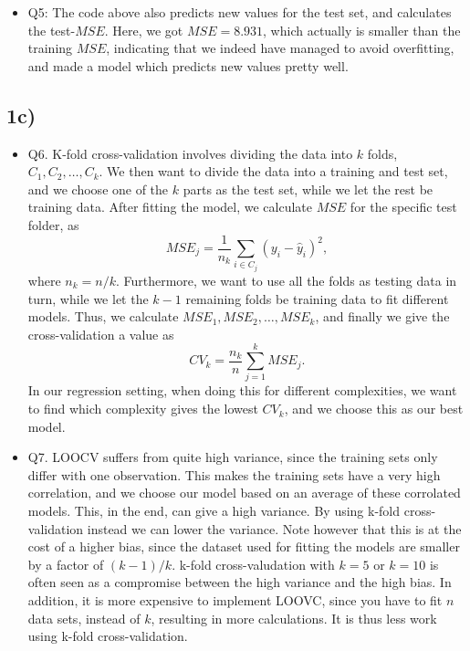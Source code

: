 \documentclass[]{article}
\providecommand{\tightlist}{%
  \setlength{\itemsep}{0pt}\setlength{\parskip}{0pt}}
\begin{document}
\begin{itemize}
\tightlist
\item
  Q5: The code above also predicts new values for the test set, and
  calculates the test-\(MSE\). Here, we got \(MSE=8.931\), which
  actually is smaller than the training \(MSE\), indicating that we
  indeed have managed to avoid overfitting, and made a model which
  predicts new values pretty well.
\end{itemize}

\subsection{1c)}\label{c}

\begin{itemize}
\item
  Q6. K-fold cross-validation involves dividing the data into \(k\)
  folds, \(C_1, C_2, \dots, C_k\). We then want to divide the data into
  a training and test set, and we choose one of the \(k\) parts as the
  test set, while we let the rest be training data. After fitting the
  model, we calculate \(MSE\) for the specific test folder, as
  \[MSE_j=\frac{1}{n_k}\sum_{i \in C_j}(y_i-\hat y_i)^2,\] where
  \(n_k=n/k\). Furthermore, we want to use all the folds as testing data
  in turn, while we let the \(k-1\) remaining folds be training data to
  fit different models. Thus, we calculate
  \(MSE_1, MSE_2,\dots, MSE_k\), and finally we give the
  cross-validation a value as \[CV_k=\frac{n_k}{n}\sum_{j=1}^k MSE_j.\]
  In our regression setting, when doing this for different complexities,
  we want to find which complexity gives the lowest \(CV_k\), and we
  choose this as our best model.
\item
  Q7. LOOCV suffers from quite high variance, since the training sets
  only differ with one observation. This makes the training sets have a
  very high correlation, and we choose our model based on an average of
  these corrolated models. This, in the end, can give a high variance.
  By using k-fold cross-validation instead we can lower the variance.
  Note however that this is at the cost of a higher bias, since the
  dataset used for fitting the models are smaller by a factor of
  \((k-1)/k\). k-fold cross-valudation with \(k=5\) or \(k=10\) is often
  seen as a compromise between the high variance and the high bias. In
  addition, it is more expensive to implement LOOVC, since you have to
  fit \(n\) data sets, instead of \(k\), resulting in more calculations.
  It is thus less work using k-fold cross-validation.
\end{itemize}
\end{document}
